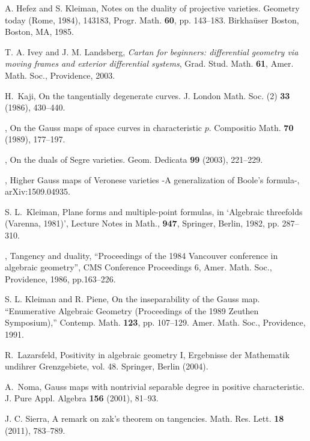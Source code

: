 \documentclass[a4paper,12pt]{amsart}
\theoremstyle{plain}
\theoremstyle{definition}
\begin{document}
\begin{thebibliography}{99}
 A. Hefez and S. Kleiman, Notes on the duality of projective varieties.
  Geometry today (Rome, 1984), 143183, Progr. Math. {\bf 60}, pp. 143--183. Birkha\"user Boston, Boston, MA, 1985.

 T. A. Ivey and J. M. Landsberg, \emph{Cartan for beginners: differential geometry via moving frames and exterior differential systems}, Grad. Stud. Math. {\bf 61}, Amer. Math. Soc., Providence, 2003.

  

  
  

  

  

  

 H.~Kaji, On the tangentially degenerate curves. J. London Math. Soc. (2) {\bf 33} (1986), 430--440.

 \bysame, On the Gauss maps of space curves in characteristic $p$. Compositio Math. {\bf 70} (1989), 177--197.

 \bysame, On the duals of Segre varieties. Geom. Dedicata {\bf 99} (2003), 221--229.

 \bysame, Higher Gauss maps of Veronese varieties
  -A generalization of Boole's formula-, arXiv:1509.04935.

 S. L.~Kleiman, Plane forms and multiple-point formulas, in `Algebraic threefolds (Varenna,
  1981)', Lecture Notes in Math., \textbf{947}, Springer, Berlin, 1982, pp. 287--310.

 \bysame, Tangency and duality, ``Proceedings of the 1984 Vancouver conference in algebraic geometry'', CMS Conference Proceedings 6, Amer. Math. Soc., Providence, 1986, pp.163--226.

 S. L. Kleiman and R. Piene, On the inseparability of the Gauss map.
  ``Enumerative Algebraic Geometry
  (Proceedings of the 1989 Zeuthen Symposium),'' Contemp. Math. {\bf 123}, pp. 107--129.
  Amer. Math. Soc., Providence, 1991.
  
  
  

  R.~Lazarsfeld, 
  Positivity in algebraic geometry I, 
  Ergebnisse der Mathematik undihrer Grenzgebiete, vol. 48. Springer, Berlin (2004).  

 A.~Noma, Gauss maps with nontrivial separable degree in positive characteristic. J. Pure Appl. Algebra {\bf 156} (2001), 81--93.

  
 J. C. Sierra, A remark on zak's theorem on tangencies. Math. Res. Lett. {\bfseries 18} (2011), 783--789.


\end{thebibliography}
\end{document}
